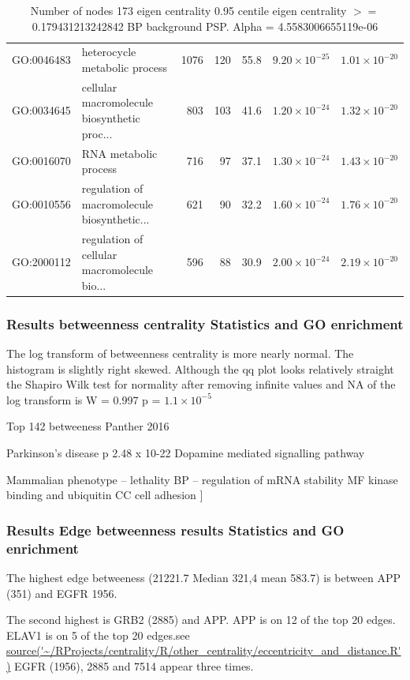 \begin{table}[ht]
\begin{tabular}{llrrrrr}
  GO:0046483 & heterocycle metabolic process & 1076 & 120 & 55.8 & $9.20 \times 10^{-25}$ & $1.01 \times 10^{-20}$ \\ 
  GO:0034645 & cellular macromolecule biosynthetic proc... & 803 & 103 & 41.6 & $1.20 \times 10^{-24}$ & $1.32 \times 10^{-20}$ \\ 
  GO:0016070 & RNA metabolic process & 716 & 97 & 37.1 & $1.30 \times 10^{-24}$ & $1.43 \times 10^{-20}$ \\ 
  GO:0010556 & regulation of macromolecule biosynthetic... & 621 & 90 & 32.2 & $1.60 \times 10^{-24}$ & $1.76 \times 10^{-20}$ \\ 
  GO:2000112 & regulation of cellular macromolecule bio... & 596 & 88 & 30.9 & $2.00 \times 10^{-24}$ & $2.19 \times 10^{-20}$ \\ 
   \hline
\end{tabular}
\caption{Number of nodes 173 eigen centrality 0.95 centile  eigen centrality $>=$ 0.179431213242842 BP background PSP. Alpha = 4.5583006655119e-06} 
\label{tab:Number of nodes 173 eigen centrality 0.95 centile  eigen centrality $>=$ 0.179431213242842 BP background PSP. Alpha = 4.5583006655119e-06}
\end{table}



\subsubsection{Results betweenness centrality Statistics and GO enrichment}
The log transform of betweenness centrality is more nearly normal. The histogram is slightly right skewed.
Although the qq plot looks relatively straight the Shapiro Wilk test for normality after removing infinite values and NA of the log transform  is 
W = 0.997 p = $1.1 \times 10^{-5}$

Top 142 betweeness
Panther 2016

Parkinson’s disease p 2.48 x 10-22
Dopamine mediated signalling pathway

Mammalian phenotype – lethality
BP – regulation of mRNA stability 
MF kinase binding and ubiquitin
CC cell adhesion
	]
\subsubsection{Results Edge betweenness results Statistics and GO enrichment}
The highest edge betweeness (21221.7 Median 321,4 mean 583.7) is between APP (351) and EGFR 1956.

The second highest is GRB2 (2885) and APP.
APP is on 12 of the top 20 edges. 
ELAV1 is on 5 of the top 20 edges.see \url{source('~/RProjects/centrality/R/other_centrality/eccentricity_and_distance.R')} EGFR (1956), 2885 and 7514 appear three times.

